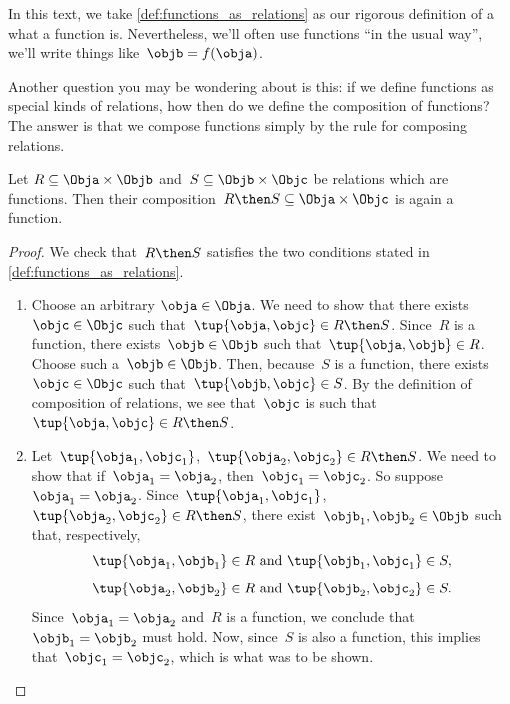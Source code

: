 In this text, we take \cref{def:functions_as_relations} as our rigorous definition of a what a function is. Nevertheless, we'll often use functions ``in the usual way'',  we'll write things like~$\objb = f(\obja)$.

Another question you may be wondering about is this: if we define functions as special kinds of relations, how then do we define the composition of functions? The answer is that we compose functions simply by the rule for composing relations.

\begin{lemma}
    \label{lemma:comprelfun}
    Let $R \subseteq \Obja \times \Objb$ and~$S \subseteq \Objb \times \Objc$ be relations which are functions. Then their composition~$R \then S \subseteq \Obja \times \Objc$ is again a function.
\end{lemma}

\begin{proof}
    We check that~$R \then S$ satisfies the two conditions stated in \cref{def:functions_as_relations}.

    \begin{enumerate}
        \item Choose an arbitrary $\obja \in \Obja$. We need to show that there exists~$\objc \in \Objc$ such that~$\tup{\obja,\objc} \in R \then S$. Since~$R$ is a function, there exists~$\objb \in \Objb$ such that~$\tup{\obja,\objb} \in R$. Choose such a~$\objb \in \Objb$. Then, because~$S$ is a function, there exists~$\objc \in \Objc$ such that~$\tup{\objb,\objc} \in S$. By the definition of composition of relations, we see that~$\objc$ is such that~$\tup{\obja,\objc} \in R \then S$.
        \item Let~$\tup{\obja_1, \objc_1}$,~$\tup{\obja_2,\objc_2} \in R \then S$. We need to show that if~$\obja_1 = \obja_2$, then~$\objc_1 = \objc_2$. So suppose~$\obja_1 = \obja_2$. Since~$\tup{\obja_1, \objc_1}$,~$\tup{\obja_2,\objc_2} \in R \then S$, there exist~$\objb_1, \objb_2 \in \Objb$ such that, respectively,
        \begin{equation*}
            \tup{\obja_1, \objb_1} \in R \text{ and } \tup{\objb_1, \objc_1} \in S,
        \end{equation*}
        \begin{equation*}
            \tup{\obja_2, \objb_2} \in R \text{ and } \tup{\objb_2, \objc_2} \in S.
        \end{equation*}
        Since~$\obja_1 = \obja_2$ and~$R$ is a function, we conclude that~$\objb_1 = \objb_2$ must hold. Now, since~$S$ is also a function, this implies that~$\objc_1 = \objc_2$, which is what was to be shown.
    \end{enumerate}
\end{proof}

